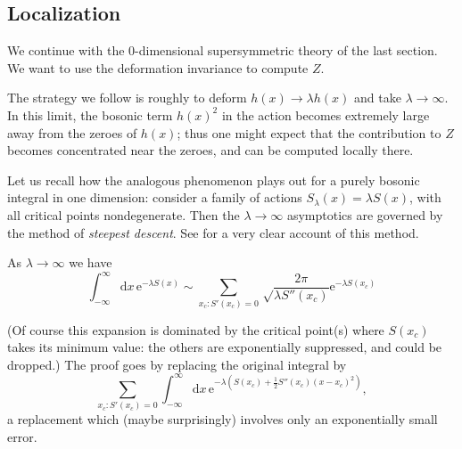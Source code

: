 \documentclass[12pt,letterpaper,reqno]{article}
\numberwithin{equation}{section}
\newcommand{\half}{\ensuremath{\frac{1}{2}}}
\newcommand{\e}{{\mathrm e}}
\newcommand{\de}{\mathrm{d}}
\newcommand{\ti}[1]{\textit{#1}}
\begin{document}
\subsection{Localization}

We continue with the $0$-dimensional supersymmetric theory of the last section. We want to use the deformation invariance to compute $Z$.

The strategy we follow is roughly to deform $h(x) \to \lambda h(x)$ and take
$\lambda \to \infty$.
In this limit, the bosonic term $h(x)^2$ in the action becomes extremely
large away from the zeroes of $h(x)$; thus one might expect that 
the contribution to $Z$ becomes concentrated near the zeroes,
and can be computed locally there.

Let us recall how the analogous phenomenon plays out for a purely bosonic
integral in one dimension:
consider a family of actions $S_\lambda(x) = \lambda S(x)$,
with all critical points nondegenerate.
Then the $\lambda \to \infty$ asymptotics 
are governed by the method of \ti{steepest descent}.
See \cite{Bender1999} for a very clear account of this method.
\begin{prop} \label{prop:saddle-expansion-1d-bosonic}
As $\lambda \to \infty$ we have
\begin{equation}
  \int_{-\infty}^\infty \de x \, \e^{-\lambda S(x)} \sim \sum_{x_c: S'(x_c) = 0}
  \sqrt\frac{2 \pi}{\lambda S''(x_c)} \e^{-\lambda S(x_c)}
\end{equation}
\end{prop}
(Of course this expansion is dominated by the critical point(s) where
$S(x_c)$ takes its minimum value: the others are exponentially suppressed,
and could be dropped.)
The proof goes by replacing the original integral by
\begin{equation}
  \sum_{x_c: S'(x_c) = 0} \int_{-\infty}^\infty \de x \, \e^{-\lambda (S(x_c) + \half S''(x_c) (x-x_c)^2)},
\end{equation}
a replacement which (maybe surprisingly) involves only an exponentially small error.
\end{document}
